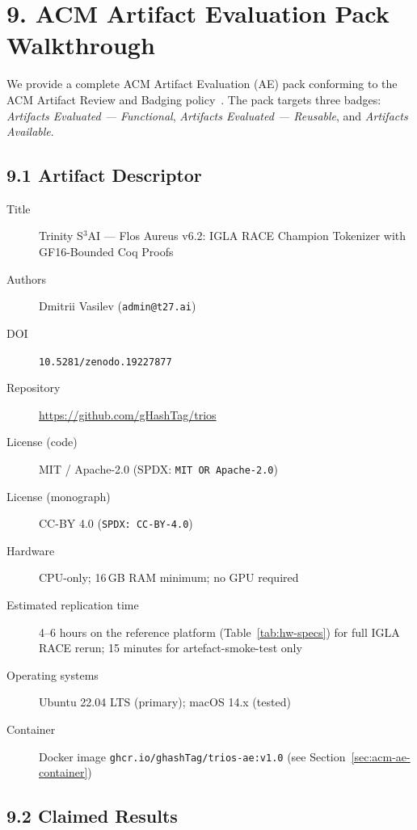 \section{9. ACM Artifact Evaluation Pack Walkthrough}%
\label{sec:acm-ae}

We provide a complete ACM Artifact Evaluation (AE) pack conforming to the
ACM Artifact Review and Badging policy~\cite{acm2020artifact}.  The pack
targets three badges: \emph{Artifacts Evaluated --- Functional},
\emph{Artifacts Evaluated --- Reusable}, and \emph{Artifacts Available}.

\subsection{9.1 Artifact Descriptor}\label{sec:ae-descriptor}

\begin{description}
\item[Title] Trinity S${}^3$AI — Flos Aureus v6.2: IGLA RACE Champion
  Tokenizer with GF16-Bounded Coq Proofs
\item[Authors] Dmitrii Vasilev (\texttt{admin@t27.ai})
\item[DOI] \texttt{10.5281/zenodo.19227877}
\item[Repository] \url{https://github.com/gHashTag/trios}
\item[License (code)] MIT / Apache-2.0 (SPDX: \texttt{MIT OR Apache-2.0})
\item[License (monograph)] CC-BY 4.0
  (\texttt{SPDX: CC-BY-4.0})
\item[Hardware] CPU-only; 16\,GB RAM minimum; no GPU required
\item[Estimated replication time] 4–6 hours on the reference platform
  (Table~\ref{tab:hw-specs}) for full IGLA RACE rerun; 15 minutes for
  artefact-smoke-test only
\item[Operating systems] Ubuntu 22.04 LTS (primary); macOS 14.x (tested)
\item[Container] Docker image \texttt{ghcr.io/ghashTag/trios-ae:v1.0}
  (see Section~\ref{sec:acm-ae-container})
\end{description}

\subsection{9.2 Claimed Results}\label{sec:ae-claimed}


